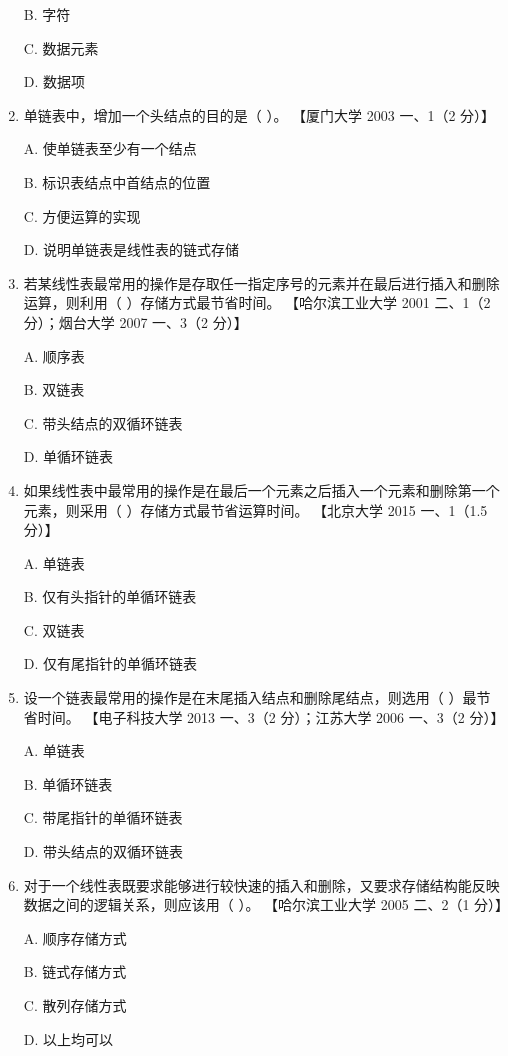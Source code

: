 \documentclass[lang=cn,newtx,10pt,scheme=chinese]{../../elegantbook}
\begin{document}
\begin{enumerate}
    B. 字符  

    C. 数据元素  

    D. 数据项  

    \item 单链表中，增加一个头结点的目的是（ ）。  
    【厦门大学 2003 一、1（2 分）】  

    A. 使单链表至少有一个结点  

    B. 标识表结点中首结点的位置  

    C. 方便运算的实现  

    D. 说明单链表是线性表的链式存储  

    \item 若某线性表最常用的操作是存取任一指定序号的元素并在最后进行插入和删除运算，则利用（ ）存储方式最节省时间。  
    【哈尔滨工业大学 2001 二、1（2 分）；烟台大学 2007 一、3（2 分）】  

    A. 顺序表  

    B. 双链表  

    C. 带头结点的双循环链表  

    D. 单循环链表  

    \item 如果线性表中最常用的操作是在最后一个元素之后插入一个元素和删除第一个元素，则采用（ ）存储方式最节省运算时间。  
    【北京大学 2015 一、1（1.5 分）】  

    A. 单链表  

    B. 仅有头指针的单循环链表  

    C. 双链表  

    D. 仅有尾指针的单循环链表  

    \item 设一个链表最常用的操作是在末尾插入结点和删除尾结点，则选用（ ）最节省时间。  
    【电子科技大学 2013 一、3（2 分）；江苏大学 2006 一、3（2 分）】  

    A. 单链表  

    B. 单循环链表  

    C. 带尾指针的单循环链表  

    D. 带头结点的双循环链表  


    \item 对于一个线性表既要求能够进行较快速的插入和删除，又要求存储结构能反映数据之间的逻辑关系，则应该用（ ）。  
    【哈尔滨工业大学 2005 二、2（1 分）】

    A. 顺序存储方式  

    B. 链式存储方式

    C. 散列存储方式

    D. 以上均可以  


\end{enumerate}
\end{document}
